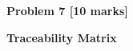 \documentclass[12pt]{article}
\begin{document}
\vspace{\baselineskip}

\vspace{\baselineskip}

\vspace{\baselineskip}

\vspace{\baselineskip}

\vspace{\baselineskip}

\vspace{\baselineskip}

\vspace{\baselineskip}

\vspace{\baselineskip}

\vspace{\baselineskip}

\vspace{\baselineskip}

\vspace{\baselineskip}

\vspace{\baselineskip}

\vspace{\baselineskip}
{\fontsize{13pt}{15.6pt}\selectfont \textbf{Problem 7 [10 marks]}\par}\par

{\fontsize{13pt}{15.6pt}\selectfont \textbf{Traceability Matrix}\par}\par


\vspace{\baselineskip}


\end{document}
